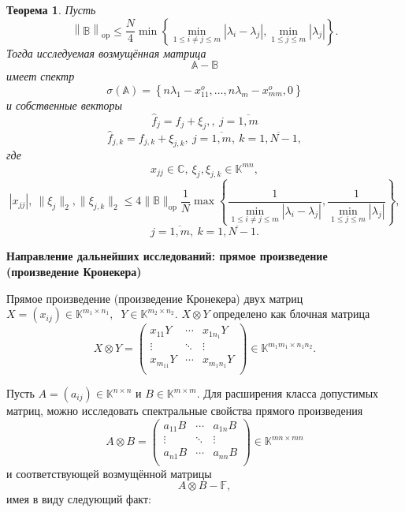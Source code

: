 \documentclass[12pt]{article}
\newtheorem{ksvthm}{Теорема}
\theoremstyle{definition}
\begin{document}
\begin{ksvthm}
    Пусть
    \[
        \left\| \mathbb{B} \right\|_{\mathrm{op}}
        \leq
        \frac{N}{4}
         \min\left\{
             \min\limits_{1\leq i{\neq}j \leq m }{|\lambda_i - \lambda_j|},
             \min\limits_{1\leq j \leq m}{|\lambda_j|}
         \right\}.
        \]
    Тогда исследуемая возмущённая матрица
    \[
        \mathbb{A} - \mathbb{B}
        \]
    имеет спектр
    \[
        \sigma\left(\mathbb{A}\right) =
        \left\{
            n\lambda_1 - x_{11}^o, \ldots, n\lambda_m - x_{mm}^o, 0
        \right\}
        \]
    и собственные векторы
    \[
        \hat{f}_j = f_j + \xi_j,
        ,\ j{=}\overline{1,m}
        \]
    \[
        \hat{f}_{j,k} = f_{j,k} + \xi_{j,k},
        \ j{=}\overline{1,m},
        \ k{=}\overline{1,N{-}1},
        \]
    где
    \[
        x_{jj}{\in}\mathbb{C},
        \ \xi_j, \xi_{j,k}{\in}\mathbb{K}^{mn},
        \]
    \[
        |x_{jj}|,\ \|\xi_j\|_2, \|\xi_{j,k}\|_2 \leq
        4 \|\mathbb{B}\|_{\mathrm{op}}
          \frac1N
          \max\left\{
          \frac{1}{
              \min\limits_{1\leq i{\neq}j \leq m }{|\lambda_i - \lambda_j|}},
          \frac{1}{
              \min\limits_{1\leq j \leq m}{|\lambda_j|}}
          \right\},
        \]
    \[
        j{=}\overline{1,m},
        \ k{=}\overline{1,N{-}1}.
        \]
\end{ksvthm}

\smallskip\textbf{Направление дальнейших исследований: прямое произведение (произведение Кронекера)}\smallskip

Прямое произведение (произведение Кронекера)
    двух матриц
    \( X{=}(x_{ij}){\in}\mathbb{K}^{m_1{\times}n_1},\ \)
    \( Y{\in}\mathbb{K}^{m_2{\times}n_2} \).
    \( X\otimes Y \)
    определено как блочная матрица
\[
    X\otimes Y =
    \begin{pmatrix}
        x_{11} Y & \cdots & x_{1n_1} Y \\
        \vdots   & \ddots & \vdots \\
        x_{m_11} Y & \cdots & x_{m_1n_1} Y \\
    \end{pmatrix}\in\mathbb{K}^{m_1m_1\times n_1n_2}.
    \]

Пусть \( A{=}(a_{ij}){\in}\mathbb{K}^{n\times n} \)
    и \( B\in\mathbb{K}^{m\times m} \).
Для расширения класса допустимых матриц,
    можно исследовать спектральные свойства прямого произведения
    \[
        A\otimes B =
        \begin{pmatrix}
            a_{11} B & \cdots & a_{1n} B \\
            \vdots   & \ddots & \vdots \\
            a_{n1} B & \cdots & a_{nn} B \\
        \end{pmatrix}\in\mathbb{K}^{mn\times mn}
        \]
    и соответствующей возмущённой матрицы
    \begin{equation}\label{ksv:disturbkron}
        A\otimes B - \mathbb{F},
    \end{equation}
    имея в виду следующий факт:
\end{document}
